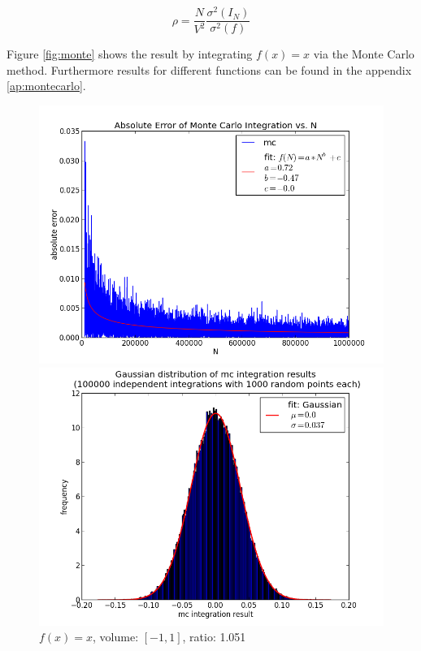 \documentclass[12pt,a4paper,titlepage]{article}
\begin{document}
\[\rho = \frac{N}{V^2}\frac{\sigma^2(I_N)}{\sigma^2(f)}\]

Figure \ref{fig:monte} shows the result by integrating $f(x)=x$ via the Monte Carlo method. Furthermore results for different functions can be found in the appendix \ref{ap:montecarlo}.


\begin{figure}
	\label{fig:monte}
\centering
\caption{$f(x)=x$, volume: $[-1,1]$, ratio: 1.051}
	\begin{minipage}[b]{\linewidth}
		\centering
		\includegraphics[width=\linewidth]{Plots/linear}
	\end{minipage}
	\begin{minipage}[b]{\linewidth}
		\centering
		\includegraphics[width=\linewidth]{Plots/linearhist}
	\end{minipage}
\label{fig:linear}
\end{figure}
\end{document}

